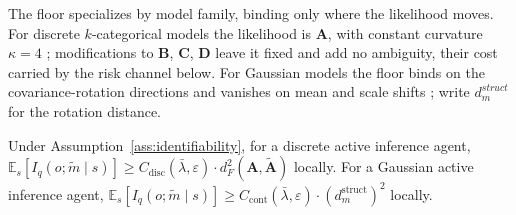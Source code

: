 \documentclass[runningheads]{llncs}
\begin{document}
The floor specializes by model family, binding only where the likelihood moves. For discrete $k$-categorical models the likelihood is $\mathbf{A}$, with constant curvature $\kappa = 4$ \cite{amari2016}; modifications to $\mathbf{B}$, $\mathbf{C}$, $\mathbf{D}$ leave it fixed and add no ambiguity, their cost carried by the risk channel below. For Gaussian models the floor binds on the covariance-rotation directions and vanishes on mean and scale shifts \cite{skovgaard1984}; write $d_m^{struct}$ for the rotation distance.

\begin{proposition}
\label{prop:mi-bound}
Under Assumption~\ref{ass:identifiability}, for a discrete active inference
agent, $\mathbb{E}_s[I_q(o; \tilde m \mid s)] \geq C_{\mathrm{disc}}(\bar\lambda, \varepsilon) \cdot d_F^2(\mathbf{A}, \tilde{\mathbf{A}})$ locally. For a Gaussian active inference agent,
$\mathbb{E}_s[I_q(o; \tilde m \mid s)] \geq C_{\mathrm{cont}}(\bar\lambda,
\varepsilon) \cdot (d^{\mathrm{struct}}_m)^2$ locally.
\end{proposition}
\end{document}
